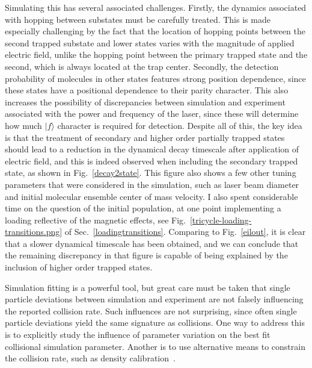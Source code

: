 Simulating this has several associated challenges.
Firstly, the dynamics associated with hopping between substates must be carefully treated.
This is made especially challenging by the fact that the location of hopping points between the second trapped substate and lower states varies with the magnitude of applied electric field, unlike the hopping point between the primary trapped state and the second, which is always located at the trap center.
Secondly, the detection probability of molecules in other states features strong position dependence, since these states have a positional dependence to their parity character.
This also increases the possibility of discrepancies between simulation and experiment associated with the power and frequency of the laser, since these will determine how much $|f\rangle$ character is required for detection.
Despite all of this, the key idea is that the treatment of secondary and higher order partially trapped states should lead to a reduction in the dynamical decay timescale after application of electric field, and this is indeed observed when including the secondary trapped state, as shown in Fig.~\ref{decay2state}.
This figure also shows a few other tuning parameters that were considered in the simulation, such as laser beam diameter and initial molecular ensemble center of mass velocity.
I also spent considerable time on the question of the initial population, at one point implementing a loading reflective of the  magnetic effects, see Fig.~\ref{tricycle-loading-transitions.png} of Sec.~\ref{loadingtransitions}.
Comparing to Fig.~\ref{eilout}, it is clear that a slower dynamical timescale has been obtained, and we can conclude that the remaining discrepancy in that figure is capable of being explained by the inclusion of higher order trapped states.

Simulation fitting is a powerful tool, but great care must be taken that single particle deviations between simulation and experiment are not falsely influencing the reported collision rate.
Such influences are not surprising, since often single particle deviations yield the same signature as collisions.
One way to address this is to explicitly study the influence of parameter variation on the best fit collisional simulation parameter.
Another is to use alternative means to constrain the collision rate, such as density calibration~\citep[Chapter~4]{WuThesis2019}. 

